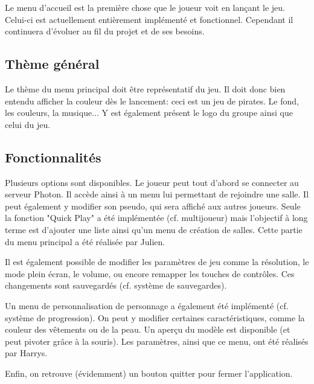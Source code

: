 \documentclass[../doc.tex]{subfiles}
\begin{document}
    Le menu d'accueil est la première chose que le joueur voit en lançant le jeu.
    Celui-ci est actuellement entièrement implémenté et fonctionnel. Cependant il continuera 
    d'évoluer au fil du projet et de ses besoins.

    
    \subsection{Thème général}
    Le thème du menu principal doit être représentatif du jeu. Il doit donc bien entendu 
    afficher la couleur dès le lancement: ceci est un jeu de pirates.
    Le fond, les couleurs, la musique... Y est également présent le logo du 
    groupe ainsi que celui du jeu.
    
    \subsection{Fonctionnalités}
    Plusieurs options sont disponibles. Le joueur peut tout d'abord se connecter 
    au serveur Photon. Il accède ainsi à un menu lui permettant de rejoindre une 
    salle. Il peut également y modifier son pseudo, qui sera affiché aux autres 
    joueurs. Seule la fonction "Quick Play" a été implémentée (cf. multijoueur) mais 
    l'objectif à long terme est d'ajouter une liste ainsi qu'un menu de création de 
    salles. Cette partie du menu principal a été réalisée par Julien.
    
    Il est également possible de modifier les paramètres de jeu comme la 
    résolution, le mode plein écran, le volume, ou encore remapper les touches de 
    contrôles. Ces changements sont sauvegardés (cf. système de sauvegardes).
    
    Un menu de personnalisation de personnage a également été implémenté 
    (cf. système de progression). On peut y modifier certaines caractéristiques, 
    comme la couleur des vêtements ou de la peau. Un aperçu du modèle est disponible 
    (et peut pivoter grâce à la souris). Les paramètres, ainsi que ce menu, ont été 
    réalisés par Harrys.
    
    Enfin, on retrouve (évidemment) un bouton quitter pour fermer l'application.
    
\end{document}
